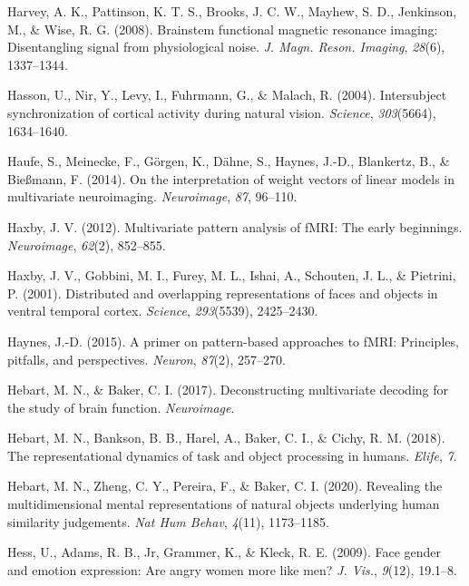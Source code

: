 \documentclass[11pt,american,a4paper,oneside,]{memoir} %
\begin{document}
\leavevmode\hypertarget{ref-Harvey2008-nt}{}%
Harvey, A. K., Pattinson, K. T. S., Brooks, J. C. W., Mayhew, S. D., Jenkinson, M., \& Wise, R. G. (2008). Brainstem functional magnetic resonance imaging: Disentangling signal from physiological noise. \emph{J. Magn. Reson. Imaging}, \emph{28}(6), 1337--1344.

\leavevmode\hypertarget{ref-Hasson2004-xb}{}%
Hasson, U., Nir, Y., Levy, I., Fuhrmann, G., \& Malach, R. (2004). Intersubject synchronization of cortical activity during natural vision. \emph{Science}, \emph{303}(5664), 1634--1640.

\leavevmode\hypertarget{ref-Haufe2014-el}{}%
Haufe, S., Meinecke, F., Görgen, K., Dähne, S., Haynes, J.-D., Blankertz, B., \& Bießmann, F. (2014). On the interpretation of weight vectors of linear models in multivariate neuroimaging. \emph{Neuroimage}, \emph{87}, 96--110.

\leavevmode\hypertarget{ref-Haxby2012-sd}{}%
Haxby, J. V. (2012). Multivariate pattern analysis of fMRI: The early beginnings. \emph{Neuroimage}, \emph{62}(2), 852--855.

\leavevmode\hypertarget{ref-Haxby2001-os}{}%
Haxby, J. V., Gobbini, M. I., Furey, M. L., Ishai, A., Schouten, J. L., \& Pietrini, P. (2001). Distributed and overlapping representations of faces and objects in ventral temporal cortex. \emph{Science}, \emph{293}(5539), 2425--2430.

\leavevmode\hypertarget{ref-haynes2015primer}{}%
Haynes, J.-D. (2015). A primer on pattern-based approaches to fMRI: Principles, pitfalls, and perspectives. \emph{Neuron}, \emph{87}(2), 257--270.

\leavevmode\hypertarget{ref-Hebart2017-jn}{}%
Hebart, M. N., \& Baker, C. I. (2017). Deconstructing multivariate decoding for the study of brain function. \emph{Neuroimage}.

\leavevmode\hypertarget{ref-Hebart2018-dz}{}%
Hebart, M. N., Bankson, B. B., Harel, A., Baker, C. I., \& Cichy, R. M. (2018). The representational dynamics of task and object processing in humans. \emph{Elife}, \emph{7}.

\leavevmode\hypertarget{ref-Hebart2020-wp}{}%
Hebart, M. N., Zheng, C. Y., Pereira, F., \& Baker, C. I. (2020). Revealing the multidimensional mental representations of natural objects underlying human similarity judgements. \emph{Nat Hum Behav}, \emph{4}(11), 1173--1185.

\leavevmode\hypertarget{ref-Hess2009-jz}{}%
Hess, U., Adams, R. B., Jr, Grammer, K., \& Kleck, R. E. (2009). Face gender and emotion expression: Are angry women more like men? \emph{J. Vis.}, \emph{9}(12), 19.1--8.
\end{document}

